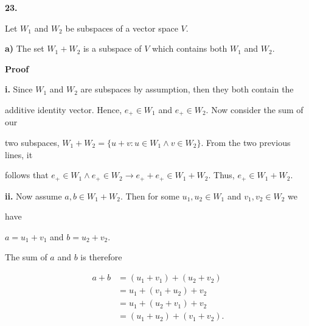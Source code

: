 \documentclass[12pt, a4paper]{article}
\begin{document}
 \vspace{6mm}
 
 \noindent\textbf{23.}\par
 
 \vspace{4mm}
 
 Let $W_1$ and $W_2$ be subspaces of a vector space $V$.
 
 \vspace{4mm}
 
 \par \textbf{a)} The set $W_1+W_2$ is a subspace of $V$ which contains both $W_1$ and $W_2$.\par
 
 \vspace{4mm}
 
 \textbf{Proof}\par
 
 \vspace{2mm}
 
\hspace{4mm}\textbf{i.} Since $W_1$ and $W_2$ are subspaces by assumption, then they both contain the 
\par additive identity vector. Hence, $e_{+}\in W_1$ and $e_{+}\in W_2$. Now consider the sum of our\par two subspaces, $W_1+W_2=\{u+v\colon u\in W_1\wedge v\in W_2\}$. From the two previous lines, it\par follows that $e_{+}\in W_1\wedge e_{+}\in W_2\rightarrow e_{+}+e_{+}\in W_1+W_2$. Thus, $e_{+}\in W_1+W_2$.\par
 
 \vspace{4mm}
 
 \hspace{4mm}\textbf{ii.} Now assume $a,b\in W_1+W_2$. Then for some $u_1,u_2\in W_1$ and $v_1,v_2\in W_2$ we\par have\par
 
 \vspace{2mm}
 
 \centerline{$a=u_1+v_1$ and $b=u_2+v_2$.}
 
 \vspace{2mm}
 
 \par The sum of $a$ and $b$ is therefore
 
\begin{equation} 
\begin{split}
a+b & = (u_1+v_1)+(u_2+v_2) \\
 & = u_1+(v_1+u_2)+v_2 \\ \nonumber
 & = u_1+(u_2+v_1)+v_2 \\
 & = (u_1+u_2)+(v_1+v_2).
\end{split}
\end{equation}
\end{document}
